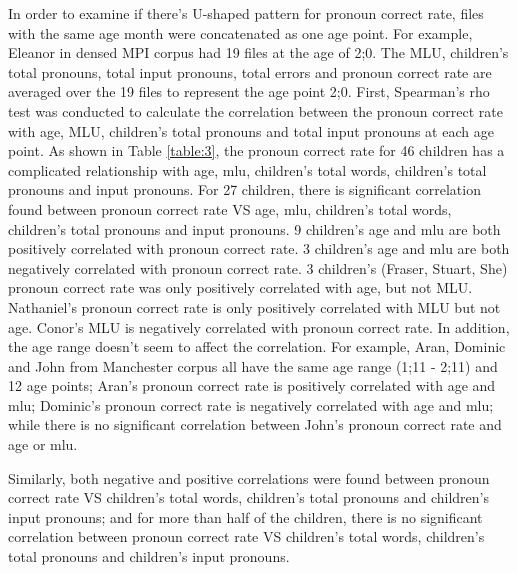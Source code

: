 In order to examine if there's U-shaped pattern for pronoun correct rate, files with the same age month were concatenated as one age point. For example, Eleanor in densed MPI corpus \citep{rowland2006effect} had 19 files at the age of 2;0. The MLU, children's total pronouns, total input pronouns, total errors and pronoun correct rate are averaged over the 19 files to represent the age point 2;0. First, Spearman's rho test was conducted to calculate the correlation between the pronoun correct rate with age, MLU, children's total pronouns and total input pronouns at each age point. As shown in Table \ref{table:3}, the pronoun correct rate for 46 children has a complicated relationship with age, mlu, children's total words, children's total pronouns and input pronouns. For 27 children, there is significant correlation found between pronoun correct rate VS age, mlu, children's total words, children's total pronouns and input pronouns. 9 children's age and mlu are both positively correlated with pronoun correct rate. 3 children's age and mlu are both negatively correlated with pronoun correct rate. 
3 children's (Fraser, Stuart, She) pronoun correct rate was only positively correlated with age, but not MLU. Nathaniel's pronoun correct rate is only positively correlated with MLU but not age. Conor's MLU is negatively correlated with pronoun correct rate. In addition, the age range doesn't seem to affect the correlation. For example, Aran, Dominic and John from Manchester corpus \citep{theakston2001} all have the same age range (1;11 - 2;11) and 12 age points; Aran's pronoun correct rate is positively correlated with age and mlu; Dominic's pronoun correct rate is negatively correlated with age and mlu; while there is no significant correlation between John's pronoun correct rate and age or mlu. 

Similarly, both negative and positive correlations were found between pronoun correct rate VS children's total words, children's total pronouns and children's input pronouns; and for more than half of the children, there is no significant correlation between pronoun correct rate VS children's total words, children's total pronouns and children's input pronouns. 

